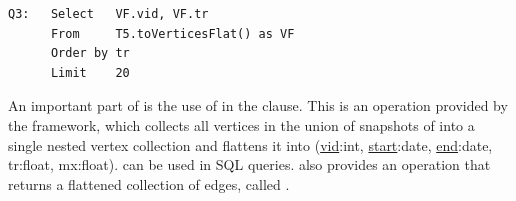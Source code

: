 \begin{small}
\begin{verbatim}
Q3:   Select   VF.vid, VF.tr  
      From     T5.toVerticesFlat() as VF
      Order by tr
      Limit    20
\end{verbatim}
\end{small}

An important part of  is the use of
 in the  clause.  This is an
operation provided by the \ql framework, which collects all vertices
in the union of snapshots of  into a single nested vertex
collection and flattens it into  (\underline{vid}:int,
\underline{start}:date, \underline{end}:date, tr:float, mx:float).
 can be used in SQL queries.  \ql also provides an operation
that returns a flattened collection of edges, called
.


